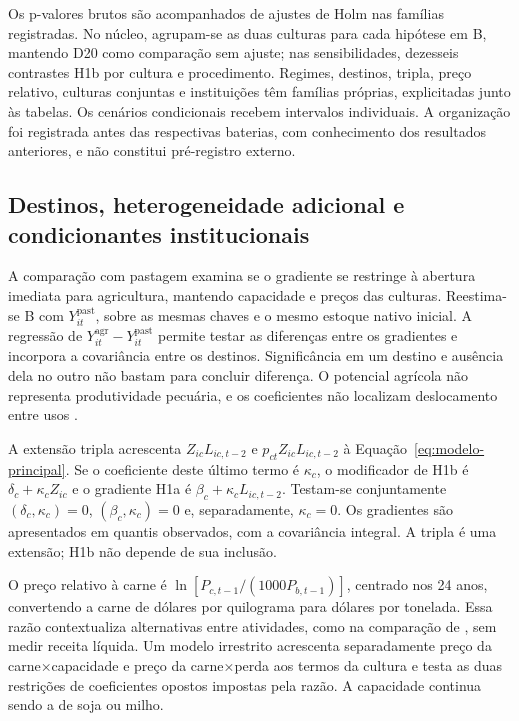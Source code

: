 Os p-valores brutos são acompanhados de ajustes de Holm nas famílias registradas. No núcleo, agrupam-se as duas culturas para cada hipótese em B, mantendo D20 como comparação sem ajuste; nas sensibilidades, dezesseis contrastes H1b por cultura e procedimento. Regimes, destinos, tripla, preço relativo, culturas conjuntas e instituições têm famílias próprias, explicitadas junto às tabelas. Os cenários condicionais recebem intervalos individuais. A organização foi registrada antes das respectivas baterias, com conhecimento dos resultados anteriores, e não constitui pré-registro externo.

\subsection{Destinos, heterogeneidade adicional e condicionantes institucionais}
\label{estrategia-logistica-instituicoes}

A comparação com pastagem examina se o gradiente se restringe à abertura imediata para agricultura, mantendo capacidade e preços das culturas. Reestima-se B com $Y_{it}^{\mathrm{past}}$, sobre as mesmas chaves e o mesmo estoque nativo inicial. A regressão de $Y_{it}^{\mathrm{agr}}-Y_{it}^{\mathrm{past}}$ permite testar as diferenças entre os gradientes e incorpora a covariância entre os destinos. Significância em um destino e ausência dela no outro não bastam para concluir diferença. O potencial agrícola não representa produtividade pecuária, e os coeficientes não localizam deslocamento entre usos \cite{MacedoEtAl2012,JungEtAl2022}.

A extensão tripla acrescenta $Z_{ic}L_{ic,t-2}$ e $p_{ct}Z_{ic}L_{ic,t-2}$ à Equação~\eqref{eq:modelo-principal}. Se o coeficiente deste último termo é $\kappa_c$, o modificador de H1b é $\delta_c+\kappa_c Z_{ic}$ e o gradiente H1a é $\beta_c+\kappa_c L_{ic,t-2}$. Testam-se conjuntamente $(\delta_c,\kappa_c)=0$, $(\beta_c,\kappa_c)=0$ e, separadamente, $\kappa_c=0$. Os gradientes são apresentados em quantis observados, com a covariância integral. A tripla é uma extensão; H1b não depende de sua inclusão.

O preço relativo à carne é $\ln[P_{c,t-1}/(1000P_{b,t-1})]$, centrado nos 24 anos, convertendo a carne de dólares por quilograma para dólares por tonelada. Essa razão contextualiza alternativas entre atividades, como na comparação de , sem medir receita líquida. Um modelo irrestrito acrescenta separadamente preço da carne×capacidade e preço da carne×perda aos termos da cultura e testa as duas restrições de coeficientes opostos impostas pela razão. A capacidade continua sendo a de soja ou milho.

